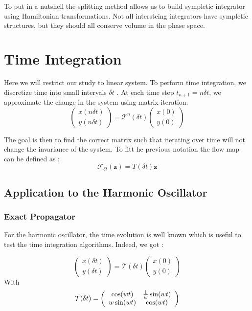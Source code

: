 \documentclass[ansiapaper]{report}
\begin{document}
\begin{multicols}{3}
  To put in a nutshell the splitting method allows us to build sympletic integrator using Hamiltonian transformations. Not all intersteing integrators have sympletic structures, but they should all conserve volume in the phase space.




  \section{Time Integration}

  Here we will restrict our study to linear system. To perform time integration, we discretize time into small intervals $\delta t$ . At each time step $t_{n+1}=n \delta t$, we approximate the change in the system using matrix iteration.
  $$ \begin{pmatrix}
      x(n\delta t) \\
      y(n\delta t)
    \end{pmatrix} = \mathcal{T}^n(\delta t) \begin{pmatrix}
      x(0) \\
      y(0)
    \end{pmatrix}$$

  The goal is then to find the correct matrix such that iterating over time will not change the invariance of the system. To fitt he previous notation the flow map can be defined as :
  $$\mathcal{F}_{\delta t}(\textbf{z} ) = T(\delta t)\textbf{z} $$

  \subsection{Application to the Harmonic Oscillator}

  \subsubsection{Exact Propagator}

  For the harmonic oscillator, the time evolution is well known which is useful to test the time integration algorithms. Indeed, we got :

  $$ \begin{pmatrix}
      x(\delta t) \\
      y(\delta  t)
    \end{pmatrix} = \mathcal{T}(\delta t) \begin{pmatrix}
      x(0) \\
      y(0)
    \end{pmatrix}$$
  With $$\mathcal{T}(\delta t) =  \left(\begin{array}{cc}
        \cos(wt)    & \frac{1}{w}\sin(wt) \\
        \-w\sin(wt) & \cos(wt)
      \end{array}\right)$$


\end{multicols}
\end{document}
